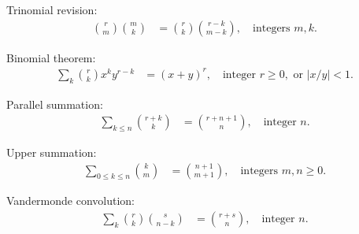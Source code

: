 \begin{identity}
    Trinomial revision:
    \begin{align*}
        \binom{r}{m} \binom{m}{k} &= \binom{r}{k} \binom{r - k}{m - k}, \quad \text{integers } m, k.
    \end{align*}
\end{identity}

\begin{identity}
    Binomial theorem:
    \begin{align*}
        \sum_{k} \binom{r}{k} x^k y^{r-k} &= (x + y)^r, \quad \text{integer } r \geq 0, \text{ or } |x/y| < 1.
    \end{align*}
\end{identity}

\begin{identity}
    Parallel summation:
    \begin{align*}
        \sum_{k \leq n} \binom{r + k}{k} &= \binom{r + n + 1}{n}, \quad \text{integer } n.
    \end{align*}
\end{identity}

\begin{identity}
    Upper summation:
    \begin{align*}
        \sum_{0 \leq k \leq n} \binom{k}{m} &= \binom{n + 1}{m + 1}, \quad \text{integers } m, n \geq 0.
    \end{align*}
\end{identity}

\begin{identity}
    Vandermonde convolution:
    \begin{align*}
        \sum_{k} \binom{r}{k} \binom{s}{n-k} &= \binom{r + s}{n}, \quad \text{integer } n.
    \end{align*}
\end{identity}




\clearpage
